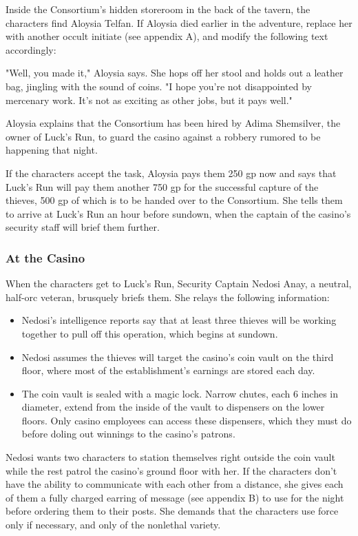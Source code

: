 \documentclass[10pt,a4paper,twoside,twocolumn,openany,nodeprecatedcode]{dndbook}
\begin{document}
Inside the Consortium's hidden storeroom in the back of the tavern, the characters find Aloysia Telfan. If Aloysia died earlier in the adventure, replace her with another occult initiate (see appendix A), and modify the following text accordingly:

\begin{DndReadAloud}{}
"Well, you made it," Aloysia says. She hops off her stool and holds out a leather bag, jingling with the sound of coins. "I hope you're not disappointed by mercenary work. It's not as exciting as other jobs, but it pays well."

\end{DndReadAloud}

Aloysia explains that the Consortium has been hired by Adima Shemsilver, the owner of Luck's Run, to guard the casino against a robbery rumored to be happening that night.

If the characters accept the task, Aloysia pays them 250 gp now and says that Luck's Run will pay them another 750 gp for the successful capture of the thieves, 500 gp of which is to be handed over to the Consortium. She tells them to arrive at Luck's Run an hour before sundown, when the captain of the casino's security staff will brief them further.

\subsubsection{At the Casino}
When the characters get to Luck's Run, Security Captain Nedosi Anay, a neutral, half-orc veteran, brusquely briefs them. She relays the following information:


\begin{itemize}
\item Nedosi's intelligence reports say that at least three thieves will be working together to pull off this operation, which begins at sundown.
\item Nedosi assumes the thieves will target the casino's coin vault on the third floor, where most of the establishment's earnings are stored each day.
\item The coin vault is sealed with a magic lock. Narrow chutes, each 6 inches in diameter, extend from the inside of the vault to dispensers on the lower floors. Only casino employees can access these dispensers, which they must do before doling out winnings to the casino's patrons.
\end{itemize}

Nedosi wants two characters to station themselves right outside the coin vault while the rest patrol the casino's ground floor with her. If the characters don't have the ability to communicate with each other from a distance, she gives each of them a fully charged earring of message (see appendix B) to use for the night before ordering them to their posts. She demands that the characters use force only if necessary, and only of the nonlethal variety.
\end{document}
